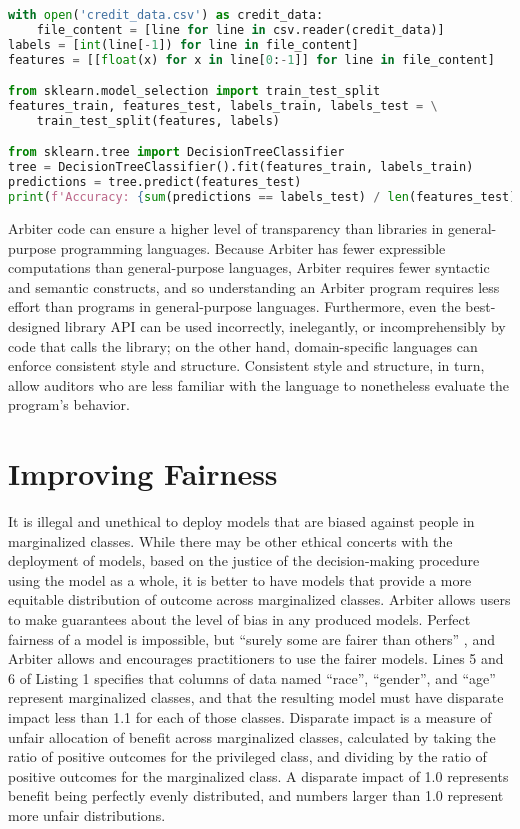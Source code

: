 \documentclass[sigconf]{acmart}
\begin{document}
\begin{lstlisting}[language=Python,caption=Python code equivalent to lines 1-3 in Listing 1.]
with open('credit_data.csv') as credit_data:
    file_content = [line for line in csv.reader(credit_data)]
labels = [int(line[-1]) for line in file_content]
features = [[float(x) for x in line[0:-1]] for line in file_content]

from sklearn.model_selection import train_test_split
features_train, features_test, labels_train, labels_test = \
    train_test_split(features, labels)

from sklearn.tree import DecisionTreeClassifier
tree = DecisionTreeClassifier().fit(features_train, labels_train)
predictions = tree.predict(features_test)
print(f'Accuracy: {sum(predictions == labels_test) / len(features_test)}')
\end{lstlisting}

Arbiter code can ensure a higher level of transparency than libraries in general-purpose programming languages. Because Arbiter has fewer expressible computations than general-purpose languages, Arbiter requires fewer syntactic and semantic constructs, and so understanding an Arbiter program requires less effort than programs in general-purpose languages. Furthermore, even the best-designed library API can be used incorrectly, inelegantly, or incomprehensibly by code that calls the library; on the other hand, domain-specific languages can enforce consistent style and structure. Consistent style and structure, in turn, allow auditors who are less familiar with the language to nonetheless evaluate the program's behavior.

\section{Improving Fairness}
It is illegal and unethical to deploy models that are biased against people in marginalized classes. While there may be other ethical concerts with the deployment of models, based on the justice of the decision-making procedure using the model as a whole, it is better to have models that provide a more equitable distribution of outcome across marginalized classes. Arbiter allows users to make guarantees about the level of bias in any produced models. Perfect fairness of a model is impossible, but ``surely some are fairer than others'' \citep{Grant2019}, and Arbiter allows and encourages practitioners to use the fairer models. Lines 5 and 6 of Listing 1 specifies that columns of data named ``race'', ``gender'', and ``age'' represent marginalized classes, and that the resulting model must have disparate impact less than 1.1 for each of those classes. Disparate impact is a measure of unfair allocation of benefit across marginalized classes, calculated by taking the ratio of positive outcomes for the privileged class, and dividing by the ratio of positive outcomes for the marginalized class. A disparate impact of 1.0 represents benefit being perfectly evenly distributed, and  numbers larger than 1.0 represent more unfair distributions.
\end{document}
